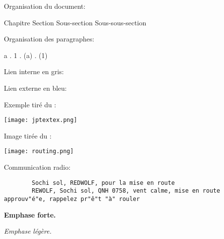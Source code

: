 
%

\e
    \item Organisation du document:

    {\Large Chapitre} {\large Section} Sous-section {\small Sous-sous-section}

    \item Organisation des paragraphes:

    {\Large a} . {\large 1} . (a) . {\small (1)}
    
    \item Lien interne en \textcolor{intlink}{gris}:
    
    
    \item Lien externe en \textcolor{extlink}{bleu}:
    
    \thirdwing    

    \item Exemple tiré du \jp{}:

    \texttt{[image: jptextex.png]}

    \item Image tirée du \jp{}:

    \texttt{[image: routing.png]}

    \item Communication radio:
    \begin{lstlisting}
        Sochi sol, REDWOLF, pour la mise en route
        REWOLF, Sochi sol, QNH 0758, vent calme, mise en route approuv"é"e, rappelez pr"ê"t "à" rouler
    \end{lstlisting}

    \item \textbf{Emphase forte.}

    \item \emph{Emphase légère.}

    \item {}
    
    
    \item {}

    \item {}

\ed 